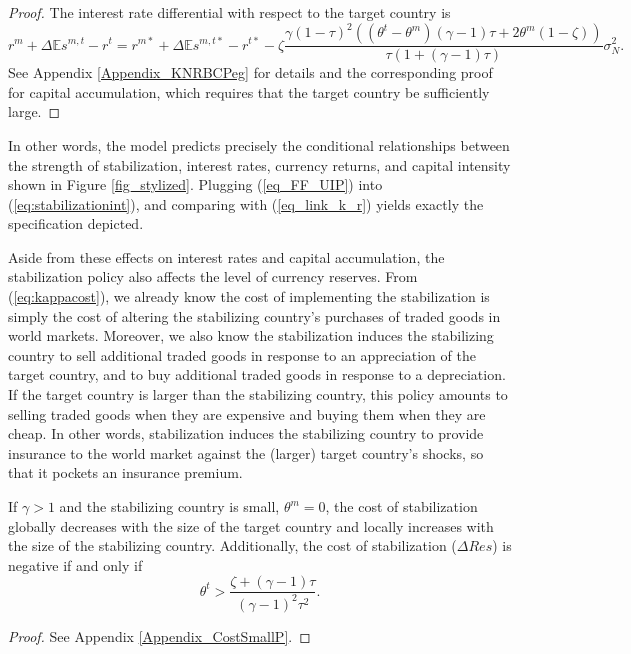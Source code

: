 \documentclass[12pt,letter]{article}
\theoremstyle{break} \theorembodyfont{\normalfont\itshape}
\theoremstyle{break}
\theoremstyle{break} \theorembodyfont{\normalfont\itshape}
\theoremstyle{break} \theorembodyfont{\normalfont\itshape}
\begin{document}
\begin{proof}
  The interest rate differential with respect to the target country is
  \begin{equation}\label{eq:stabilizationint}
    r^m + \Delta \mathbb{E}s^{m, t} - r^t = 
    r^{m \ast} + \Delta \mathbb{E}s^{m, t \ast} - r^{t \ast} -
    \zeta \frac{\gamma (1 - \tau)^2 \left( (\theta^t - \theta^m)(\gamma - 1) \tau + 2 \theta^m (1 - \zeta) \right)}{\tau (1 + (\gamma - 1) \tau)} \sigma_N^2.
  \end{equation}
  See Appendix \ref{Appendix_KNRBCPeg} for details and the
  corresponding proof for capital accumulation, which requires that
  the target country be sufficiently large.
\end{proof}

In other words, the model predicts precisely the conditional
relationships between the strength of stabilization, interest rates,
currency returns, and capital intensity shown in Figure
\ref{fig_stylized}. Plugging (\ref{eq_FF_UIP}) into
(\ref{eq:stabilizationint}), and comparing with (\ref{eq_link_k_r})
yields exactly the specification depicted.

Aside from these effects on interest rates and capital accumulation,
the stabilization policy also affects the level of currency reserves.
From (\ref{eq:kappacost}), we already know the cost of implementing
the stabilization is simply the cost of altering the stabilizing
country's purchases of traded goods in world markets. Moreover, we
also know the stabilization induces the stabilizing country to sell
additional traded goods in response to an appreciation of the target
country, and to buy additional traded goods in response to a
depreciation. If the target country is larger than the stabilizing
country, this policy amounts to selling traded goods when they are
expensive and buying them when they are cheap. In other words,
stabilization induces the stabilizing country to provide insurance to
the world market against the (larger) target country's shocks, so that
it pockets an insurance premium.

\begin{prop}
  If \(\gamma>1\) and the stabilizing country is small,
  $\theta^m = 0$, the cost of stabilization globally decreases with
  the size of the target country and locally increases with the size
  of the stabilizing country. Additionally, the cost of stabilization
  (\(\Delta Res\)) is negative if and only if
  \begin{equation*}
    \theta^t > \frac{\zeta + (\gamma - 1) \tau}{(\gamma - 1)^2 \tau^2}.
  \end{equation*}\label{prop:CostSmallP}
\end{prop}
\vspace{-0.8cm}
\begin{proof}
  See Appendix \ref{Appendix_CostSmallP}.
\end{proof}
\end{document}
